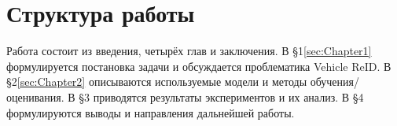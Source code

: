 \section{Структура работы}
Работа состоит из введения, четырёх глав и заключения. В \S1\ref{sec:Chapter1} формулируется постановка задачи и обсуждается проблематика Vehicle ReID. В \S2\ref{sec:Chapter2} описываются используемые модели и методы обучения/оценивания. В \S3 приводятся результаты экспериментов и их анализ. В \S4 формулируются выводы и направления дальнейшей работы.
